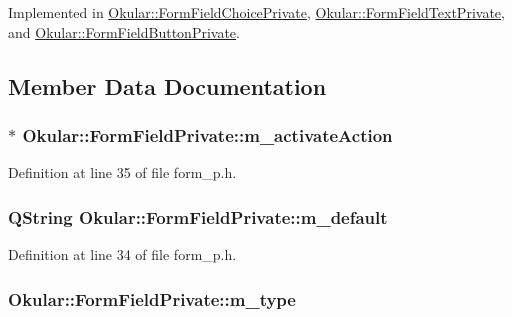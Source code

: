 Implemented in \hyperlink{classOkular_1_1FormFieldChoicePrivate_a9e0734a416520cf24ff87b84d8a1ab52}{Okular\+::\+Form\+Field\+Choice\+Private}, \hyperlink{classOkular_1_1FormFieldTextPrivate_ab0c130aa8e19814cf19e3d7e4080cfa5}{Okular\+::\+Form\+Field\+Text\+Private}, and \hyperlink{classOkular_1_1FormFieldButtonPrivate_a3d75f359bdb5ba6afda7575029b65cf5}{Okular\+::\+Form\+Field\+Button\+Private}.



\subsection{Member Data Documentation}
\hypertarget{classOkular_1_1FormFieldPrivate_a3026383e91509ad4e88c6178bb82c916}{
\subsubsection[{m\+\_\+activate\+Action}]{$\ast$ Okular\+::\+Form\+Field\+Private\+::m\+\_\+activate\+Action}}\label{classOkular_1_1FormFieldPrivate_a3026383e91509ad4e88c6178bb82c916}


Definition at line 35 of file form\+\_\+p.\+h.

\hypertarget{classOkular_1_1FormFieldPrivate_acaa274a6d0a3a146bc5230c886453039}{
\subsubsection[{m\+\_\+default}]{\setlength{\rightskip}{0pt plus 5cm}Q\+String Okular\+::\+Form\+Field\+Private\+::m\+\_\+default}}\label{classOkular_1_1FormFieldPrivate_acaa274a6d0a3a146bc5230c886453039}


Definition at line 34 of file form\+\_\+p.\+h.

\hypertarget{classOkular_1_1FormFieldPrivate_a00873a8ab669135c3ea701f3c5942e64}{
\subsubsection[{m\+\_\+type}]{ Okular\+::\+Form\+Field\+Private\+::m\+\_\+type}}\label{classOkular_1_1FormFieldPrivate_a00873a8ab669135c3ea701f3c5942e64}



